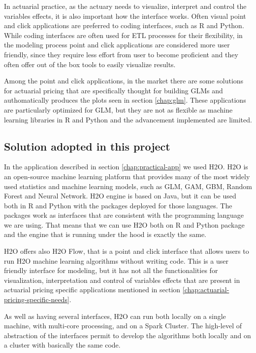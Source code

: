 \documentclass[a4paper, nobind]{templates/ociamthesis}
\theoremstyle{definition}
\theoremstyle{definition}
\theoremstyle{definition}
\theoremstyle{remark}
\begin{document}
In actuarial practice, as the actuary needs to visualize, interpret and control the variables effects, it is also important how the interface works. Often visual point and click applications are preferred to coding interfaces, such as R and Python. While coding interfaces are often used for ETL processes for their flexibility, in the modeling process point and click applications are considered more user friendly, since they require less effort from user to become proficient and they often offer out of the box tools to easily visualize results.

Among the point and click applications, in the market there are some solutions for actuarial pricing that are specifically thought for building GLMs and authomatically produces the plots seen in section \ref{chap:glm}. These applications are particularly optimized for GLM, but they are not as flexible as machine learning libraries in R and Python and the advancement implemented are limited.

\hypertarget{solution-adopted-in-this-project}{%
\subsection{Solution adopted in this project}\label{solution-adopted-in-this-project}}

In the application described in section \ref{chap:practical-app} we used H2O. H2O is an open-source machine learning platform that provides many of the most widely used statistics and machine learning models, such as GLM, GAM, GBM, Random Forest and Neural Network. H2O engine is based on Java, but it can be used both in R and Python with the packages deployed for those languages. The packages work as interfaces that are consistent with the programming language we are using. That means that we can use H2O both on R and Python package and the engine that is running under the hood is exactly the same.

H2O offers also H2O Flow, that is a point and click interface that allows users to run H2O machine learning algorithms without writing code. This is a user friendly interface for modeling, but it has not all the functionalities for visualization, interpretation and control of variables effects that are present in actuarial pricing specific applications mentioned in section \ref{chap:actuarial-pricing-specific-needs}.

As well as having several interfaces, H2O can run both locally on a single machine, with multi-core processing, and on a Spark Cluster. The high-level of abstraction of the interfaces permit to develop the algorithms both locally and on a cluster with basically the same code.
\end{document}
